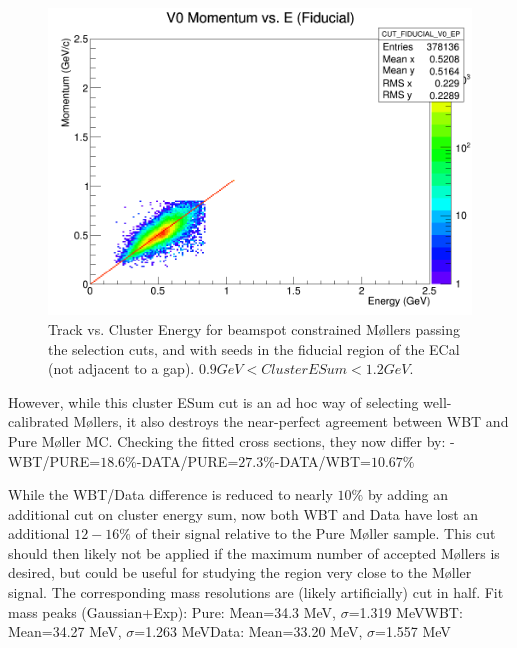 \documentclass{article}
\begin{document}
\begin{figure}[H]
  	\includegraphics[width=\linewidth]{MollerPlots/FIDUCIAL_EP_tightPSum}
  	\caption{Track vs. Cluster Energy for beamspot constrained M\o llers passing the selection cuts, and with seeds in the fiducial region of the ECal (not adjacent to a gap). $0.9 GeV<Cluster ESum<1.2GeV$.}
  	\label{fig:EPFiducial2}
	\end{figure}

However, while this cluster ESum cut is an ad hoc way of selecting well-calibrated M\o llers, it also destroys the near-perfect agreement between WBT and Pure M\o ller MC. Checking the fitted cross sections, they now differ by:
\newline{}-WBT/PURE=$18.6\%$-DATA/PURE=$27.3\%$-DATA/WBT=$10.67\%$\newline

While the WBT/Data difference is reduced to nearly $10\%$ by adding an additional cut on cluster energy sum, now both WBT and Data have lost an additional $12-16\%$ of their signal relative to the Pure M\o ller sample. This cut should then likely not be applied if the maximum number of accepted M\o llers is desired, but could be useful for studying the region very close to the M\o ller signal. The corresponding mass resolutions are (likely artificially) cut in half.
\newline \newline Fit mass peaks (Gaussian+Exp): \newline Pure: Mean=34.3 MeV,  $\sigma$=1.319 MeV\newline WBT: Mean=34.27 MeV, $\sigma$=1.263 MeV\newline Data: Mean=33.20 MeV, $\sigma$=1.557 MeV
\end{document}
